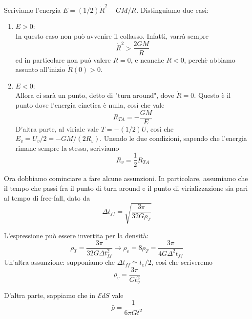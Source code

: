 \documentclass{report}
\begin{document}
Scriviamo l'energia $E = (1/2)\dot{R}^2 - GM/R$. Distinguiamo due casi: 

\begin{enumerate}
    \item $E>0$: \\
    In questo caso non può avvenire il collasso. Infatti, varrà sempre 
    \begin{equation}
        \dot{R}^2 > \frac{2GM}{R}
    \end{equation}
    ed in particolare non può valere $\dot{R}=0$, e neanche $\dot{R}<0$, perchè abbiamo assunto all'inizio $\dot{R}(0)>0$. 
    \item $E<0$: \\
    Allora ci sarà un punto, detto di "turn around", dove $\dot{R}=0$. Questo è il punto dove l'energia cinetica è nulla, così che vale 
    \begin{equation}
        R_{TA} = -\frac{GM}{E}
    \end{equation}
    D'altra parte, al viriale vale $T = -(1/2)U$, così che $E_v = U_v/2 = -GM/(2R_v)$. Unendo le due condizioni, sapendo che l'energia rimane sempre la stessa, scriviamo 
    \begin{equation}
        R_v = \frac{1}{2}R_{TA}
    \end{equation}
\end{enumerate}

Ora dobbiamo cominciare a fare alcune assunzioni. In particolare, assumiamo che il tempo che passi fra il punto di turn around e il punto di virializzazione sia pari al tempo di free-fall, dato da 
\begin{equation}
    \Delta t_{ff} = \sqrt{\frac{3\pi}{32G\rho_T}}
\end{equation}

L'espressione può essere invertita per la densità: 
\begin{equation}
    \rho_T = \frac{3\pi}{32G\Delta t^2_{ff}} \rightarrow \rho_v = 8\rho_T = \frac{3\pi}{4G\Delta^2t_{ff}}
\end{equation}
Un'altra assunzione: supponiamo che $\Delta t_{ff} \simeq t_v/2$, così che scriveremo
\begin{equation}
    \rho_v = \frac{3\pi}{Gt_v^2}
\end{equation}

D'altra parte, sappiamo che in $\mathcal{E}dS$ vale 
\begin{equation}
    \bar{\rho} = \frac{1}{6\pi G t^2}
\end{equation}
\end{document}
